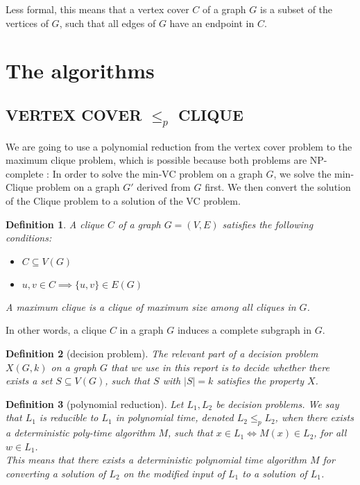 \documentclass[11pt,a4paper]{article}
\newtheorem*{definition}{Definition}
\begin{document}
Less formal, this means that a vertex cover $C$ of a graph $G$ is a subset of the vertices of $G$, such that all edges of $G$ have an endpoint in $C$. \\


\section{The algorithms}

\subsection{VERTEX COVER $\leq_{p}$ CLIQUE}

We are going to use a polynomial reduction from the vertex cover problem to the maximum clique problem, which is possible because both problems are NP-complete \cite{Patric}:
In order to solve the min-VC problem on a graph $G$, we solve the min-Clique problem on a graph $G'$ derived from $G$ first. We then convert the solution of the Clique problem to a solution of the VC problem.  

\begin{definition}
A \emph{clique} $C$ of a graph $G=(V,E)$ satisfies the following conditions:

\begin{itemize}
\item $C \subseteq V(G)$
\item $u, v \in C \implies \{u, v\} \in E(G)$
\end{itemize}

A \emph{maximum clique} is a clique of maximum size among all cliques in $G$.
\end{definition}

In other words, a clique $C$ in a graph $G$ induces a complete subgraph in $G$. \\

\begin{definition}[decision problem]
The relevant part of a decision problem $X(G,k)$ on a graph $G$ that we use in this report is to decide whether there exists a set $S \subseteq V(G)$, such that $S$ with $|S| = k$ satisfies the property $X$. 
\end{definition}

\begin{definition}[polynomial reduction]
Let $L_{1}, L_{2}$ be decision problems. We say that $L_{1}$ is reducible to $L_{1}$ in polynomial time, denoted $L_{2} \leq_{p} L_{2}$, when there exists a deterministic poly-time algorithm $M$, such that $x \in L_{1} \iff M(x) \in L_{2}$, for all $w \in L_{1}$. \\

This means that there exists a deterministic polynomial time algorithm $M$ for converting a solution of $L_{2}$ on the modified input of $L_{1}$ to a solution of $L_{1}$. 
\end{definition}
\end{document}

